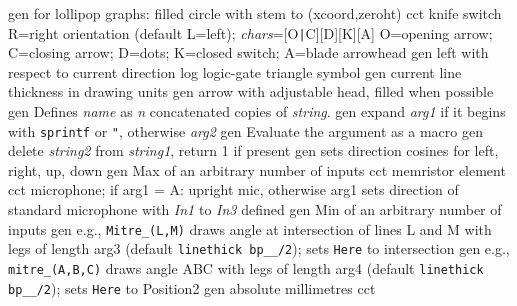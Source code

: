   {gen}
  {for lollipop graphs: filled circle with stem to (xcoord,zeroht)}
  {cct}
  {knife switch R=right orientation (default L=left);
    {\sl chars}=[O{\tt|}C][D][K][A] O=opening arrow; C=closing arrow; D=dots;
    K=closed switch; A=blade arrowhead }
  {gen}
  {left with respect to current direction}
  {log}
  {logic-gate triangle symbol}
  {gen}
  {current line thickness in drawing units}
  {gen}
  {arrow with adjustable head, filled when possible}
  {gen}
  {Defines {\sl name} as {\sl n} concatenated copies of {\sl string}.}
  {gen}
  {expand {\sl arg1} if it begins
    with {\tt sprintf} or {\tt "}, otherwise {\sl arg2}}
  {gen}
  {Evaluate the argument as a macro}
  {gen}
  {delete {\sl string2} from {\sl string1}, return 1 if present}
  {gen}
  {sets direction cosines for left, right, up, down}
  {gen}
  {Max of an arbitrary number of inputs}
  {cct}
  {memristor element}
  {cct}
  {microphone; if arg1 = A: upright mic, otherwise arg1 sets direction
   of standard microphone with
   {\sl In1} to {\sl In3} defined
   }
  {gen}
  {Min of an arbitrary number of inputs}
  {gen}
  {e.g., {\tt Mitre\_(L,M)} draws angle at intersection of lines
   L and M with legs of length arg3 (default {\tt linethick bp\_\_/2});
   sets {\tt Here} to intersection
    }
  {gen}
  {e.g., {\tt mitre\_(A,B,C)} draws angle ABC with legs
   of length arg4 (default {\tt linethick bp\_\_/2});
   sets {\tt Here} to Position2
    }
  {gen}
  {absolute millimetres}
  {cct}
